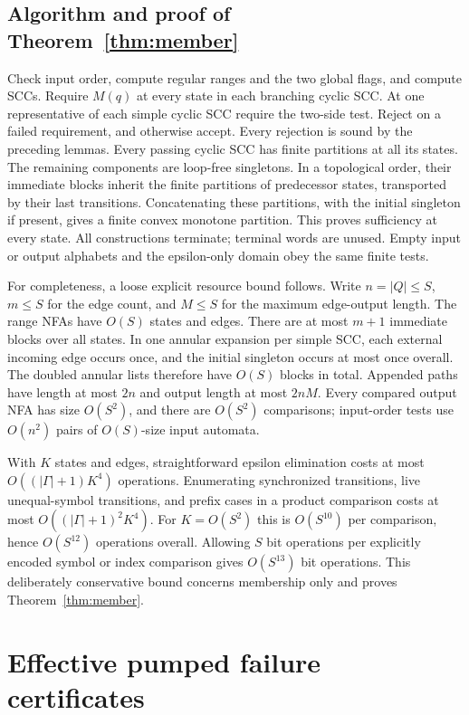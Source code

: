 \documentclass[acmsmall,screen,nonacm,11pt]{acmart}
\theoremstyle{definition}
\begin{document}
\subsection{Algorithm and proof of Theorem~\ref{thm:member}}

Check input order, compute regular ranges and the two global flags, and
compute SCCs. Require $M(q)$ at every state in each branching cyclic SCC.
At one representative of each simple cyclic SCC require the two-side test.
Reject on a failed requirement, and otherwise accept. Every rejection is
sound by the preceding lemmas. Every passing cyclic SCC has finite partitions
at all its states. The remaining components are loop-free singletons.
In a topological order, their immediate blocks inherit the finite partitions
of predecessor states, transported by their last transitions. Concatenating
these partitions, with the initial singleton if present, gives a finite
convex monotone partition. This proves sufficiency at every state.
All constructions terminate; terminal words are unused. Empty input or
output alphabets and the epsilon-only domain obey the same finite tests.

For completeness, a loose explicit resource bound follows. Write
$n=|Q|\leq S$, $m\leq S$ for the edge count, and $M\leq S$ for the maximum
edge-output length. The range NFAs have $O(S)$ states and edges. There are
at most $m+1$ immediate blocks over all states. In one annular expansion per
simple SCC, each external incoming edge occurs once, and the initial
singleton occurs at most once overall. The doubled annular lists therefore
have $O(S)$ blocks in total. Appended paths have length at most $2n$ and
output length at most $2nM$. Every compared output NFA has size $O(S^2)$,
and there are $O(S^2)$ comparisons; input-order tests use $O(n^2)$ pairs of
$O(S)$-size input automata.

With $K$ states and edges, straightforward epsilon elimination costs at
most $O((|\Gamma|+1)K^4)$ operations. Enumerating synchronized transitions,
live unequal-symbol transitions, and prefix cases in a product comparison
costs at most $O((|\Gamma|+1)^2K^4)$. For $K=O(S^2)$ this is $O(S^{10})$
per comparison, hence $O(S^{12})$ operations overall. Allowing $S$ bit
operations per explicitly encoded symbol or index comparison gives
$O(S^{13})$ bit operations. This deliberately conservative bound concerns
membership only and proves Theorem~\ref{thm:member}.

\section{Effective pumped failure certificates}\label{sec:cert}
\end{document}
